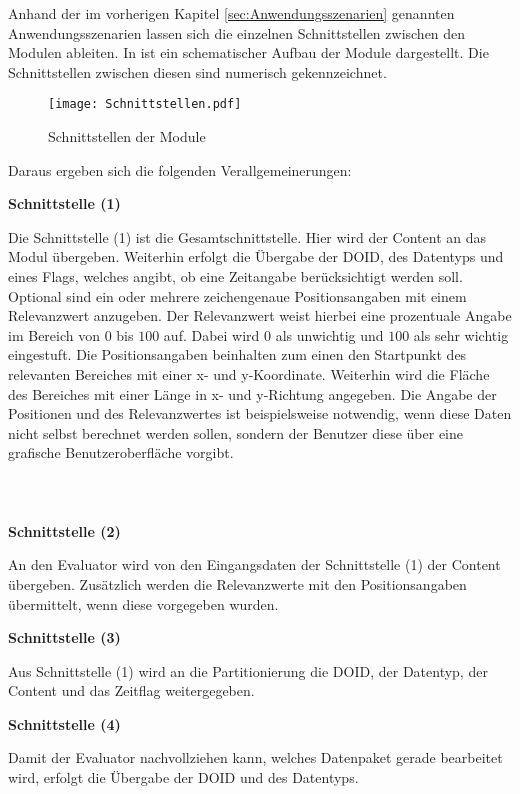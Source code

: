 Anhand der im vorherigen Kapitel \ref{sec:Anwendungsszenarien} genannten Anwendungsszenarien lassen
sich die einzelnen Schnittstellen zwischen den Modulen ableiten. In
 ist ein schematischer Aufbau der Module
dargestellt. Die Schnittstellen zwischen diesen sind numerisch gekennzeichnet.

\begin{figure}[H]
\centering
\texttt{[image: Schnittstellen.pdf]}
\caption{Schnittstellen der Module}
\label{fig:Schnittstellen}
\end{figure}

Daraus ergeben sich die folgenden Verallgemeinerungen:

\textbf{Schnittstelle (1)}

Die Schnittstelle (1) ist die Gesamtschnittstelle. Hier wird der
Content an das Modul übergeben. Weiterhin erfolgt die Übergabe der \gls{DOID}, des
Datentyps und eines Flags, welches angibt, ob eine Zeitangabe berücksichtigt
werden soll.
Optional sind ein oder mehrere zeichengenaue Positionsangaben mit einem
Relevanzwert anzugeben. Der Relevanzwert weist hierbei eine
prozentuale Angabe im Bereich von $0$ bis $100$ auf. Dabei wird $0$ als
unwichtig und $100$ als sehr wichtig eingestuft. Die Positionsangaben beinhalten
zum einen den Startpunkt des relevanten Bereiches mit einer x- und y-Koordinate. Weiterhin
wird die Fläche des Bereiches mit einer Länge in x- und y-Richtung angegeben.
Die Angabe der Positionen und des Relevanzwertes ist beispielsweise notwendig,
wenn diese Daten nicht selbst berechnet werden sollen, sondern der Benutzer
diese über eine grafische Benutzeroberfläche vorgibt.
\\\\\\\\

\textbf{Schnittstelle (2)} 

An den Evaluator wird von den Eingangsdaten der Schnittstelle (1)
der Content übergeben. Zusätzlich werden die Relevanzwerte mit den
Positionsangaben übermittelt, wenn diese vorgegeben wurden.

\textbf{Schnittstelle (3)} 

Aus Schnittstelle (1) wird an die Partitionierung
die \gls{DOID}, der Datentyp, der Content und das Zeitflag weitergegeben.

\textbf{Schnittstelle (4)} 

Damit der Evaluator nachvollziehen kann, welches Datenpaket gerade bearbeitet
wird, erfolgt die Übergabe der \gls{DOID} und des Datentyps.  

